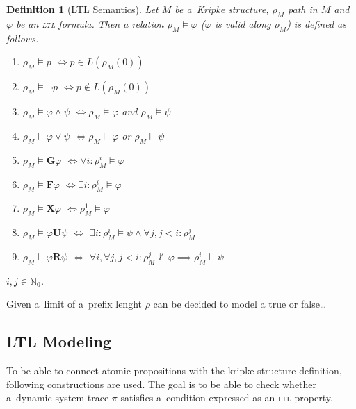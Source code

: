 \documentclass[12pt,oneside,draft]{fithesis}
\newcommand{\mNatural}{\mathbb{N}}
\newcommand{\bF}{\mathbf{F}}
\newcommand{\bG}{\mathbf{G}}
\newcommand{\bX}{\mathbf{X}}
\newcommand{\bU}{\mathbf{U}}
\newcommand{\bR}{\mathbf{R}}
\newtheorem{mydef}{Definition}
\begin{document}
\begin{mydef}[LTL Semantics]
Let $M$ be a~Kripke structure, $\rho_M$ path in $M$ and $\varphi$ be
an \textsc{ltl} formula. Then a relation $\rho_M\models\varphi$
($\varphi$ is valid along $\rho_M$) is defined as follows\cite{biere}.
\begin{enumerate}
	\item{$\rho_M\models p$} $\iff p\in L(\rho_M(0))$
	\item{$\rho_M\models\neg p$} $\iff p\notin L(\rho_M(0))$
	\item{$\rho_M\models \varphi\wedge\psi$}
		$\iff\rho_M\models\varphi$ and
		$\rho_M\models\psi$
	\item{$\rho_M\models \varphi\vee\psi$}
		$\iff\rho_M\models\varphi$ or
		$\rho_M\models\psi$
	\item{$\rho_M\models\bG\varphi$}
		$\iff\forall i: \rho_M^i\models\varphi$
	\item{$\rho_M\models\bF\varphi$}
		$\iff\exists i: \rho_M^i\models\varphi$
	\item{$\rho_M\models\bX\varphi$}
		$\iff\rho_M^1\models\varphi$
	\item{$\rho_M\models\varphi\bU\psi$} $\iff$
		$\exists i: \rho_M^i\models\psi \wedge\forall j, j<i: \rho_M^j$
	\item{$\rho_M\models\varphi\bR\psi$} $\iff$
$\forall i,\forall j,j<i:\rho_M^j\not\models\varphi\implies\rho_M^i\models\psi$
\end{enumerate}
$i,j\in\mNatural_0$.
\end{mydef}

Given a~limit of a~prefix lenght $\rho$ can be decided to model
a true or false\dots


\subsection{LTL Modeling}
To be able to connect atomic propositions with the kripke structure
definition, following constructions are used. The goal is to be able
to check whether a~dynamic system trace $\pi$ satisfies a~condition
expressed as an \textsc{ltl} property.
\end{document}
